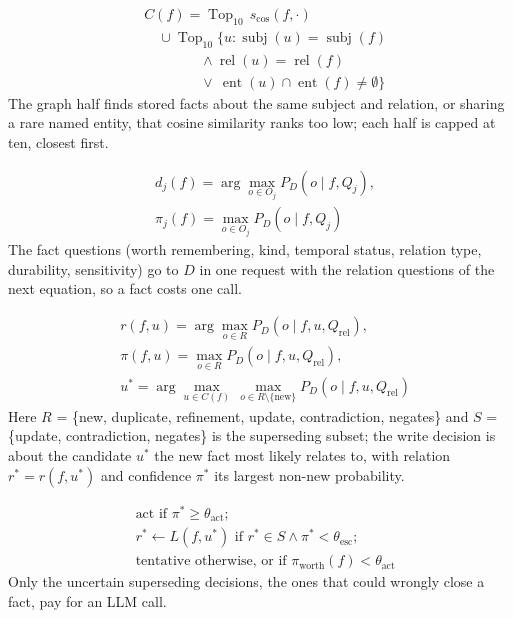 \documentclass[11pt]{article}
\begin{document}
\begin{align}
& C(f) = \operatorname{Top}_{10}\, s_{\cos}(f, \cdot) \nonumber\\
& \quad \cup \operatorname{Top}_{10}\bigl\{u : \operatorname{subj}(u) = \operatorname{subj}(f) \nonumber\\
& \qquad\qquad \wedge \operatorname{rel}(u) = \operatorname{rel}(f) \nonumber\\
& \qquad\qquad \vee\ \operatorname{ent}(u) \cap \operatorname{ent}(f) \neq \emptyset\bigr\} \label{eq:cand}
\end{align}
The graph half finds stored facts about the same subject and relation, or sharing a rare named entity, that cosine similarity ranks too low; each half is capped at ten, closest first.

\begin{align}
& d_j(f) = \arg\max_{o \in O_j} P_D(o \mid f, Q_j), \nonumber\\
& \pi_j(f) = \max_{o \in O_j} P_D(o \mid f, Q_j) \label{eq:factq}
\end{align}
The fact questions (worth remembering, kind, temporal status, relation type, durability, sensitivity) go to $D$ in one request with the relation questions of the next equation, so a fact costs one call.

\begin{align}
& r(f,u) = \arg\max_{o \in R} P_D(o \mid f, u, Q_{\text{rel}}), \nonumber\\
& \pi(f,u) = \max_{o \in R} P_D(o \mid f, u, Q_{\text{rel}}), \nonumber\\
& u^{*} = \arg\max_{u \in C(f)}\, \max_{o \in R \setminus \{\text{new}\}} P_D(o \mid f, u, Q_{\text{rel}}) \label{eq:rel}
\end{align}
Here $R$ = \{new, duplicate, refinement, update, contradiction, negates\} and $S$ = \{update, contradiction, negates\} is the superseding subset; the write decision is about the candidate $u^{*}$ the new fact most likely relates to, with relation $r^{*} = r(f, u^{*})$ and confidence $\pi^{*}$ its largest non-new probability.

\begin{align}
& \text{act if } \pi^{*} \ge \theta_{\text{act}}; \nonumber\\
& r^{*} \leftarrow L(f, u^{*}) \text{ if } r^{*} \in S \wedge \pi^{*} < \theta_{\text{esc}}; \nonumber\\
& \text{tentative otherwise, or if } \pi_{\text{worth}}(f) < \theta_{\text{act}} \label{eq:zones}
\end{align}
Only the uncertain superseding decisions, the ones that could wrongly close a fact, pay for an LLM call.
\end{document}
